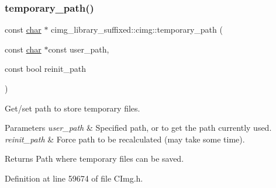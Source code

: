 \mbox{\label{namespacecimg__library__suffixed_1_1cimg_ae9af8e17db04e875db3b45cbe58892d6}} 
\subsubsection{\texorpdfstring{temporary\+\_\+path()}{temporary\_path()}}
{\footnotesize\ttfamily const \hyperlink{classchar}{char} $\ast$ cimg\+\_\+library\+\_\+suffixed\+::cimg\+::temporary\+\_\+path (\begin{DoxyParamCaption}\item[{const \hyperlink{classchar}{char} $\ast$const}]{user\+\_\+path,  }\item[{const bool}]{reinit\+\_\+path }\end{DoxyParamCaption})\hspace{0.3cm}{\ttfamily [inline]}}



Get/set path to store temporary files. 


\begin{DoxyParams}{Parameters}
{\em user\+\_\+path} & Specified path, or {} to get the path currently used. \\
\hline
{\em reinit\+\_\+path} & Force path to be recalculated (may take some time). \\
\hline
\end{DoxyParams}
\begin{DoxyReturn}{Returns}
Path where temporary files can be saved. 
\end{DoxyReturn}


Definition at line 59674 of file C\+Img.\+h.



